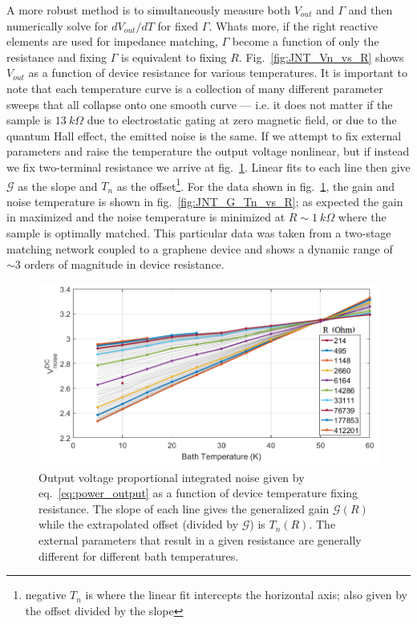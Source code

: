 A more robust method is to simultaneously measure both $V_{out}$ and $\Gamma$ and then numerically solve for $dV_{out}/dT$ for fixed $\Gamma$. Whats more, if the right reactive elements are used for impedance matching, $\Gamma$ become a function of only the resistance and fixing $\Gamma$ is equivalent to fixing $R$. Fig.~\ref{fig:JNT_Vn_vs_R} shows $V_{out}$ as a function of device resistance for various temperatures. It is important to note that each temperature curve is a collection of many different parameter sweeps that all collapse onto one smooth curve --- i.e. it does not matter if the sample is $13~k\Omega$ due to electrostatic gating at zero magnetic field, or due to the quantum Hall effect, the emitted noise is the same. If we attempt to fix external parameters and raise the temperature the output voltage nonlinear, but if instead we fix two-terminal resistance we arrive at fig.~\ref{fig:JNT_Vn_vs_T}. Linear fits to each line then give $\mathcal{G}$ as the slope and $T_n$ as the offset\footnote{negative $T_n$ is where the linear fit intercepts the horizontal axis; also given by the offset divided by the slope}. For the data shown in fig.~\ref{fig:JNT_Vn_vs_T}, the gain and noise temperature is shown in fig.~\ref{fig:JNT_G_Tn_vs_R}; as expected the gain in maximized and the noise temperature is minimized at $R\sim 1~k\Omega$ where the sample is optimally matched. This particular data was taken from a two-stage matching network coupled to a graphene device and shows a dynamic range of ${\sim}3$ orders of magnitude in device resistance.
\begin{figure}
\centering
\includegraphics[width = 130mm]{figures/Johnson_noise_thermometry/Vn_vs_T}
\caption{Output voltage proportional integrated noise given by eq.~\ref{eq:power_output} as a function of device temperature fixing resistance. The slope of each line gives the generalized gain $\mathcal{G}(R)$ while the extrapolated offset (divided by $\mathcal{G}$) is $T_n(R)$. The external parameters that result in a given resistance are generally different for different bath temperatures.}
\label{fig:JNT_Vn_vs_T}
\end{figure}

